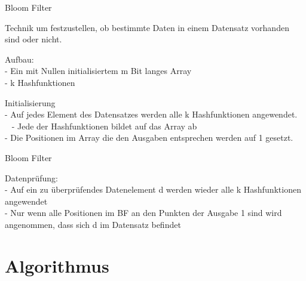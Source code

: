 \documentclass{beamer}
\begin{document}
\begin{frame}{Bloom Filter}
	
	\begin{arrowlist}
		\item Technik um festzustellen, ob bestimmte Daten in einem Datensatz vorhanden sind oder nicht.
		\item  Aufbau:\\
		- Ein mit Nullen initialisiertem m Bit langes Array \\ 
		- k Hashfunktionen\\
		\item Initialisierung\\
		- Auf jedes Element des Datensatzes werden alle k Hashfunktionen angewendet.\\ 
		- Jede der Hashfunktionen bildet auf das Array ab\\
		- Die Positionen im Array die den Ausgaben entsprechen werden auf 1 gesetzt.\\
		
	\end{arrowlist}
	
\end{frame}
\begin{frame}{Bloom Filter}
	\begin{arrowlist}
		
		\item Datenprüfung:\\
		- Auf ein zu überprüfendes Datenelement d werden wieder alle k Hashfunktionen angewendet\\
		- Nur wenn alle Positionen im BF an den Punkten der Ausgabe 1 sind wird angenommen, dass sich d im Datensatz befindet
	\end{arrowlist}
	
\end{frame}

\section{Algorithmus}
\end{document}
